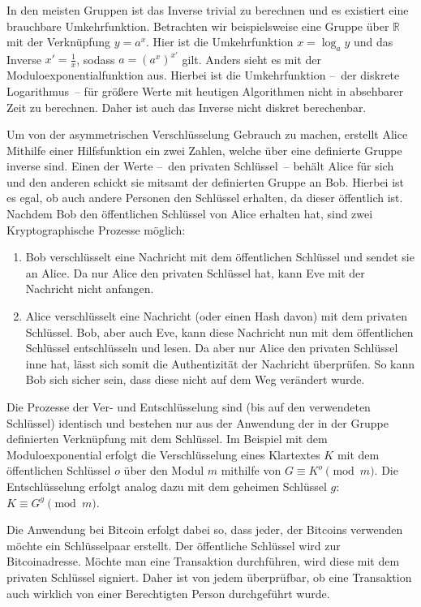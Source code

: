 In den meisten Gruppen ist das Inverse trivial zu berechnen und es existiert eine brauchbare Umkehrfunktion.
Betrachten wir beispielsweise eine Gruppe über $\mathbb{R}$ mit der Verknüpfung $y=a^x$.
Hier ist die Umkehrfunktion $x=\log_a y$ und das Inverse $x'=\frac{1}{x}$, sodass $a=(a^x)^{x'}$ gilt.
Anders sieht es mit der Moduloexponentialfunktion aus.
Hierbei ist die Umkehrfunktion --~der diskrete Logarithmus~-- für größere Werte mit heutigen Algorithmen nicht in absehbarer Zeit zu berechnen.
Daher ist auch das Inverse nicht diskret berechenbar.

Um von der asymmetrischen Verschlüsselung Gebrauch zu machen, erstellt Alice Mithilfe einer Hilfsfunktion ein zwei Zahlen, welche über eine definierte Gruppe inverse sind.
Einen der Werte --~den privaten Schlüssel~-- behält Alice für sich und den anderen schickt sie mitsamt der definierten Gruppe an Bob.
Hierbei ist es egal, ob auch andere Personen den Schlüssel erhalten, da dieser öffentlich ist.
Nachdem Bob den öffentlichen Schlüssel von Alice erhalten hat, sind zwei Kryptographische Prozesse möglich:
\begin{enumerate}
    \item Bob verschlüsselt eine Nachricht mit dem öffentlichen Schlüssel und sendet sie an Alice.
    Da nur Alice den privaten Schlüssel hat, kann Eve mit der Nachricht nicht anfangen.
    \item Alice verschlüsselt eine Nachricht (oder einen Hash davon) mit dem privaten Schlüssel.
    Bob, aber auch Eve, kann diese Nachricht nun mit dem öffentlichen Schlüssel entschlüsseln und lesen.
    Da aber nur Alice den privaten Schlüssel inne hat, lässt sich somit die Authentizität der Nachricht überprüfen.
    So kann Bob sich sicher sein, dass diese nicht auf dem Weg verändert wurde.
\end{enumerate}

Die Prozesse der Ver- und Entschlüsselung sind (bis auf den verwendeten Schlüssel) identisch und bestehen nur aus der Anwendung der in der Gruppe definierten Verknüpfung mit dem Schlüssel.
Im Beispiel mit dem Moduloexponential erfolgt die Verschlüsselung eines Klartextes $K$ mit dem öffentlichen Schlüssel $o$ über den Modul $m$ mithilfe von $G \equiv K^o \pmod{m}$.
Die Entschlüsselung erfolgt analog dazu mit dem geheimen Schlüssel $g$: $K \equiv G^g \pmod{m}$.

Die Anwendung bei Bitcoin erfolgt dabei so, dass jeder, der Bitcoins verwenden möchte ein Schlüsselpaar erstellt.
Der öffentliche Schlüssel wird zur Bitcoinadresse.
Möchte man eine Transaktion durchführen, wird diese mit dem privaten Schlüssel signiert.
Daher ist von jedem überprüfbar, ob eine Transaktion auch wirklich von einer Berechtigten Person durchgeführt wurde.

